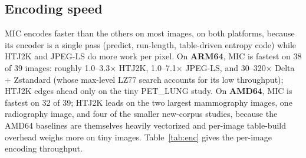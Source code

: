\documentclass[journal]{IEEEtran}
\begin{document}
\subsection{Encoding speed}

MIC encodes faster than the others on most images, on both platforms,
because its encoder is a single pass (predict, run-length, table-driven
entropy code) while HTJ2K and JPEG-LS do more work per pixel. On
\textbf{ARM64}, MIC is fastest on 38 of 39 images: roughly 1.0--3.3$\times$
HTJ2K, 1.0--7.1$\times$ JPEG-LS, and 30--320$\times$ Delta + Zstandard (whose
max-level LZ77 search accounts for its low throughput); HTJ2K edges ahead only
on the tiny PET\_LUNG study. On \textbf{AMD64}, MIC is fastest on 32 of 39;
HTJ2K leads on the two largest mammography images, one radiography image, and
four of the smaller new-corpus studies, because the AMD64 baselines are
themselves heavily vectorized and per-image table-build overhead weighs more on
tiny images.
Table~\ref{tab:enc} gives the per-image encoding throughput.
\end{document}

